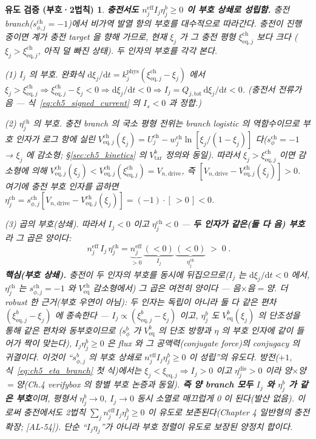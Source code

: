 \documentclass[11pt,a4paper]{article}
\newtheorem*{verifybox}{유도 검증 (부호·2법칙)}
\newcommand{\dd}{\mathrm{d}}
\newcommand{\eff}{\mathrm{eff}}
\newcommand{\eq}{\mathrm{eq}}
\newcommand{\drive}{\mathrm{drive}}
\newcommand{\tot}{\mathrm{tot}}
\newcommand{\dis}{\mathrm{dis}}
\newcommand{\chg}{\mathrm{ch}}
\newcommand{\tar}{\mathrm{tar}}
\newcommand{\AL}[1]{\textsf{[AL-#1]}}
\begin{document}
\begin{verifybox}
\textbf{충전서도 $n_j^{\eff}I_j\eta_j^b\ge0$ 이 \emph{부호 상쇄}로 성립함.}
충전 branch($s_{\phi,j}^\chg=-1$)에서 비가역 발열 항의 부호를 \emph{대수적으로} 따라간다. 충전이 진행 중이면
계가 충전 target 을 향해 가므로, 현재 $\xi_j$ 가 그 충전 평형 $\xi_{\eq,j}^\chg$ 보다 \emph{크다}
($\xi_j>\xi_{\eq,j}^\chg$, 아직 덜 빠진 상태). 두 인자의 부호를 각각 본다.

\emph{(1) $I_j$ 의 부호.} 완화식 $\dd\xi_j/\dd t=k_j^{\mathrm{phys}}(\xi_{\eq,j}^\chg-\xi_j)$ 에서
$\xi_j>\xi_{\eq,j}^\chg\Rightarrow\xi_{\eq,j}^\chg-\xi_j<0\Rightarrow\dd\xi_j/\dd t<0\Rightarrow I_j=Q_{j,\tot}
\,\dd\xi_j/\dd t<0$. (충전서 전류가 음 — 식~\eqref{eq:ch5_signed_current} 의 $I_s<0$ 과 정합.)

\emph{(2) $\eta_j^\chg$ 의 부호.} 충전 branch 의 국소 평형 전위는 branch logistic 의 \emph{역함수}이므로 부호 인자가
로그 항에 실린 $V_{\eq,j}^\chg(\xi_j)=U_j^\chg-w_j^\chg\ln[\xi_j/(1-\xi_j)]$ 다($s_{\phi}^\chg=-1$ → $\xi_j$ 에
\emph{감소}형; \S\ref{sec:ch5_kinetics} 의 $V_{\tar}^b$ 정의와 동일). 따라서 $\xi_j>\xi_{\eq,j}^\chg$ 이면 감소형에
의해 $V_{\eq,j}^\chg(\xi_j)<V_{\eq,j}^\chg(\xi_{\eq,j}^\chg)=V_{n,\drive}$, 즉 $[V_{n,\drive}-V_{\eq,j}^\chg(\xi_j)]>0$.
여기에 충전 부호 인자를 곱하면 $\eta_j^\chg=s_{\phi,j}^\chg[V_{n,\drive}-V_{\eq,j}^\chg(\xi_j)]=(-1)\cdot[\,>0\,]<0$.

\emph{(3) 곱의 부호(상쇄).} 따라서 $I_j<0$ \emph{이고} $\eta_j^\chg<0$ — \textbf{두 인자가 \emph{같은}(둘 다
음) 부호}라 그 곱은 양이다:
\begin{equation}
\boxed{\;n_j^{\eff}\,I_j\,\eta_j^\chg=\underbrace{n_j^{\eff}}_{>0}\,\underbrace{(<0)}_{I_j}\,\underbrace{(<0)}_{\eta_j^\chg}\;>\;0\;.}
\label{eq:ch5_qirr_charge}
\end{equation}
\textbf{핵심(부호 상쇄).} 충전이 \emph{두 인자의 부호를 동시에} 뒤집으므로($I_j$ 는 $\dd\xi_j/\dd t<0$ 에서,
$\eta_j^\chg$ 는 $s_{\phi,j}^\chg=-1$ \emph{와} $V_{\eq}^\chg$ 감소형에서) 그 곱은 \emph{여전히 양}이다 — 음$\times$음$=$양.
\emph{더 robust 한 근거(부호 우연이 아님)}: 두 인자는 독립이 아니라 둘 다 같은 편차 $(\xi_{\eq,j}^b-\xi_j)$ 에 종속한다
— $I_j\propto(\xi_{\eq,j}^b-\xi_j)$ 이고, $\eta_j^b$ 도 $V_{\eq}^b(\xi_j)$ 의 단조성을 통해 같은 편차와 동부호이므로
($s_\phi^b$ 가 $V_{\eq}^b$ 의 단조 방향과 $\eta$ 의 부호 인자에 \emph{같이} 들어가 짝이 맞는다), $I_j\eta_j^b\ge0$ 은
flux 와 그 공액력(conjugate force)의 conjugacy 의 귀결이다. 이것이
``$s_{\phi,j}^b$ 의 부호 상쇄로 $n_j^{\eff}I_j\eta_j^b\ge0$ 이 성립''의 \emph{유도}다. 방전($+1$,
식~\eqref{eq:ch5_eta_branch} 첫 식)에서는 $\xi_j<\xi_{\eq,j}\Rightarrow I_j>0$ \emph{이고} $\eta_j^\dis>0$
이라 양$\times$양$=$양(Ch.4 verifybox 의 항별 부호 논증과 동일). \textbf{즉 양 branch 모두 $I_j$ 와 $\eta_j^b$
가 같은 부호}이며, 평형서 $\eta_j^b\to0,\ I_j\to0$ 동시 소멸로 매끄럽게 0 이 된다(발산 없음). 이로써
충전에서도 2법칙 $\sum_j n_j^{\eff}I_j\eta_j^b\ge0$ 이 \emph{유도}로 보존된다(Chapter 4 일반형의 충전 확장;
\AL{54}). 단순 ``$I_j\eta_j$''가 아니라 \emph{부호 정렬이 유도로 보장된} 양정치 합이다.
\end{verifybox}
\end{document}
